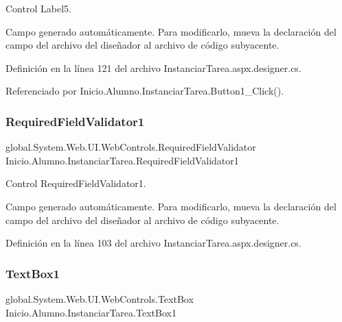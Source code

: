 Control Label5. 

Campo generado automáticamente. Para modificarlo, mueva la declaración del campo del archivo del diseñador al archivo de código subyacente. 

Definición en la línea 121 del archivo Instanciar\+Tarea.\+aspx.\+designer.\+cs.



Referenciado por Inicio.\+Alumno.\+Instanciar\+Tarea.\+Button1\+\_\+\+Click().

\mbox{\label{classInicio_1_1Alumno_1_1InstanciarTarea_a1e423dc085c8909b5fdc7f7183b93614}} 
\subsubsection{\texorpdfstring{RequiredFieldValidator1}{RequiredFieldValidator1}}
{\footnotesize\ttfamily global.\+System.\+Web.\+U\+I.\+Web\+Controls.\+Required\+Field\+Validator Inicio.\+Alumno.\+Instanciar\+Tarea.\+Required\+Field\+Validator1\hspace{0.3cm}{\ttfamily [protected]}}



Control Required\+Field\+Validator1. 

Campo generado automáticamente. Para modificarlo, mueva la declaración del campo del archivo del diseñador al archivo de código subyacente. 

Definición en la línea 103 del archivo Instanciar\+Tarea.\+aspx.\+designer.\+cs.

\mbox{\label{classInicio_1_1Alumno_1_1InstanciarTarea_a21afc2c731dc3af4dd47991ca901261a}} 
\subsubsection{\texorpdfstring{TextBox1}{TextBox1}}
{\footnotesize\ttfamily global.\+System.\+Web.\+U\+I.\+Web\+Controls.\+Text\+Box Inicio.\+Alumno.\+Instanciar\+Tarea.\+Text\+Box1\hspace{0.3cm}{\ttfamily [protected]}}



